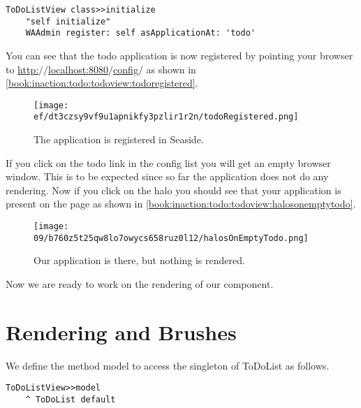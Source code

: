 \documentclass[a4paper,10pt,twoside]{book}
\newcommand{\ct}[1]{{\small\ttfamily\textup{#1}}}
\begin{document}
\begin{lstlisting}
ToDoListView class>>initialize
    "self initialize"
    WAAdmin register: self asApplicationAt: 'todo'
\end{lstlisting}

You can see that the todo application is now registered by pointing your browser to \href{http://localhost:8080/config/}{http:$/$$/$localhost:8080$/$config$/$} as shown in \autoref{book:inaction:todo:todoview:todoregistered}.

\begin{figure}[h!tbp]
	\begin{center}
		\texttt{[image: ef/dt3czsy9vf9u1apnikfy3pzlir1r2n/todoRegistered.png]}
		\caption{The application is registered in Seaside.\label{book:inaction:todo:todoview:todoregistered}}
	\end{center}
\end{figure}


If you click on the todo link in the config list you will get an empty browser window. This is to be expected since so far the application does not do any rendering. Now if you click on the halo you should see that your application is present on the page as shown in \autoref{book:inaction:todo:todoview:halosonemptytodo}.

\begin{figure}[h!tbp]
	\begin{center}
		\texttt{[image: 09/b760z5t25qw8lo7owycs658ruz0l12/halosOnEmptyTodo.png]}
		\caption{Our application is there, but nothing is rendered.\label{book:inaction:todo:todoview:halosonemptytodo}}
	\end{center}
\end{figure}


Now we are ready to work on the rendering of our component.

\section{Rendering and Brushes}
\label{book:inaction:todo:renderingandbrushes}

We define the method \ct{model} to access the singleton of \ct{ToDoList} as follows.

\begin{lstlisting}
ToDoListView>>model
    ^ ToDoList default
\end{lstlisting}
\end{document}
